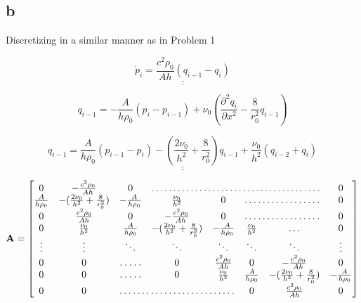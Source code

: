 \documentclass{article}
\begin{document}
\subsection{b}

Discretizing in a similar manner as in Problem 1 

\begin{equation*}
    \underline{\underline{\dot p_i = \frac{c^2\rho_0}{Ah}(q_{i-1} - q_i)}}
\end{equation*}

\begin{equation*}
    q_{i-1} = -\frac{A}{h\rho_0}(p_{i} - p_{i-1}) + \nu_0(\frac{\partial^2 q_{i}}{\partial x^2} - \frac{8}{r_0^2}q_{i-1})
\end{equation*}

\begin{equation*}
    \underline{\underline{q_{i-1} = \frac{A}{h\rho_0}(p_{i-1} - p_{i}) - (\frac{2\nu_0}{h^2} + \frac{8}{r_0^2})q_{i-1} + \frac{\nu_0}{h^2}(q_{i-2} + q_i)}}
\end{equation*}


\begin{equation*}
    \mathbf{A} = \begin{bmatrix}
        0 & -\frac{c^2\rho_0}{Ah} & 0 & \hdotsfor{4} & 0\\
        \frac{A}{h\rho_0} & -(\frac{2\nu_0}{h^2} + \frac{8}{r_0^2}) & -\frac{A}{h\rho_0} & \frac{\nu_0}{h^2} & 0 & \hdotsfor{2} & 0\\
        0 & \frac{c^2\rho_0}{Ah} & 0 & -\frac{c^2\rho_0}{Ah} &  0 & \hdotsfor{2} & 0\\
        0 & \frac{\nu_0}{h^2} & \frac{A}{h\rho_0} & -(\frac{2\nu_0}{h^2} + \frac{8}{r_0^2}) & -\frac{A}{h\rho_0} & \frac{\nu_0}{h^2} & \hdots & 0\\
        \vdots & \vdots & \ddots & \ddots & \ddots & \ddots & \ddots & \vdots \\
        0 & 0 &  \hdotsfor{1} & 0 & \frac{c^2\rho_0}{Ah} & 0 & -\frac{c^2\rho_0}{Ah}& 0\\
        0 & 0 & \hdotsfor{1} & 0 & \frac{\nu_0}{h^2} & \frac{A}{h\rho_0} & -(\frac{2\nu_0}{h^2} + \frac{8}{r_0^2}) & -\frac{A}{h\rho_0}\\
        0 & 0 & \hdotsfor{3} & 0 & \frac{c^2\rho_0}{Ah}& 0
    \end{bmatrix}
\end{equation*}
\end{document}
